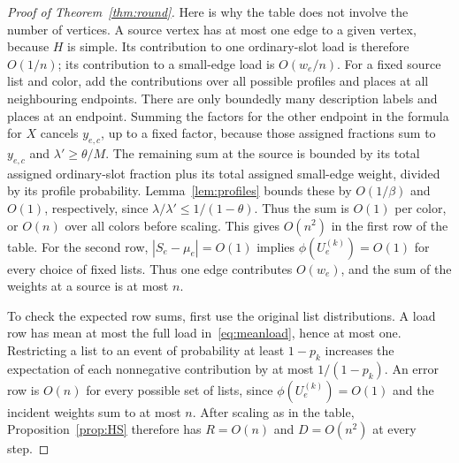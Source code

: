 \documentclass[11pt]{article}
\theoremstyle{definition}\newtheorem{algorithm}{Algorithm}[section]
\numberwithin{equation}{section}
\theoremstyle{remark}\newtheorem*{remark}{Remark}
\begin{document}
\begin{proof}[Proof of Theorem~\ref{thm:round}]
Here is why the table does not involve the number of vertices. A source
vertex has at most one edge to a given vertex, because $H$ is simple.
Its contribution to one ordinary-slot load is therefore $O(1/n)$; its
contribution to a small-edge load is $O(w_e/n)$. For a fixed source list
and color, add the contributions over all possible profiles and places
at all neighbouring endpoints. There are only boundedly many description
labels and places at an endpoint. Summing the factors for the other
endpoint in the formula for $X$ cancels $y_{e,c}$, up to a fixed factor,
because those assigned fractions sum to $y_{e,c}$ and $\lambda'\ge\theta/M$.
The remaining sum at the source is bounded by its total assigned
ordinary-slot fraction plus its total assigned small-edge weight, divided
by its profile probability. Lemma~\ref{lem:profiles} bounds these by
$O(1/\beta)$ and $O(1)$, respectively, since
$\lambda/\lambda'\le1/(1-\theta)$. Thus the sum is $O(1)$ per color,
or $O(n)$ over all colors before scaling. This gives $O(n^2)$
in the first row of the table. For the second row,
$|S_e-\mu_e|=O(1)$ implies $\phi(U_e^{(k)})=O(1)$ for every
choice of fixed lists. Thus one edge contributes $O(w_e)$, and the sum
of the weights at a source is at most $n$.


To check the expected row sums, first use the original list distributions.
A load row has mean at most the full load in~\eqref{eq:meanload}, hence
at most one. Restricting a list to an event of probability at least
$1-p_k$ increases the expectation of each nonnegative contribution by
at most $1/(1-p_k)$. An error row is $O(n)$ for every possible set of
lists, since $\phi(U_e^{(k)})=O(1)$ and the incident weights sum to at
most $n$.
After scaling as in the table, Proposition~\ref{prop:HS} therefore has
$R=O(n)$ and $D=O(n^2)$ at every step.


\end{proof}
\end{document}
